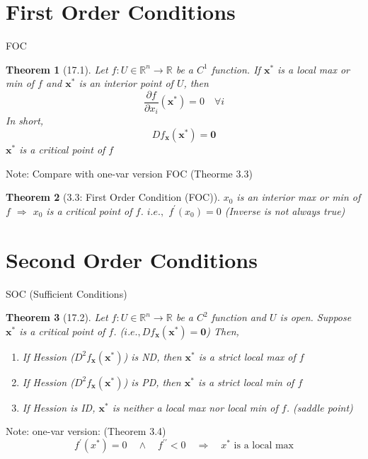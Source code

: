 \documentclass[a4paper,11pt]{article}
\newtheorem{thm}{Theorem}
\newcommand{\bb}{\mathbb}
\newcommand{\bd}{\mathbf}
\newcommand{\p}{\partial}
\begin{document}
\section{First Order Conditions} %
\label{sec:first_order_conditions}
\begin{frame}[t]{FOC}
	\begin{thm}
		[17.1] Let $f:U\in\bb{R}^n\rightarrow\bb{R}$ be a $C^1$ function. If $\bd{x^\ast}$ is a local max or min of $f$ and $\bd{x^\ast}$ is an interior point of $U$, then\[
			\frac{\p f}{\p x_i}(\bd{x^\ast})=0\quad\forall i
		\] In short, \[
			Df_{\bd{x}}(\bd{x^\ast}) = \bd{0}
		\] $\bd{x^\ast}$ is a critical point of $f$
	\end{thm}
	Note: Compare with one-var version FOC (Theorme 3.3)	\begin{thm}
		[3.3: First Order Condition (FOC)]
		$x_0$ is an interior max or min of $f$ $\Rightarrow$ $x_0$ is a critical point of $f$. $i.e.,$ $f^\prime(x_0)=0$
		(Inverse is not always true)
	\end{thm}
\end{frame}

\section{Second Order Conditions} %
\label{sec:second_order_conditions}
\begin{frame}[t]{SOC (Sufficient Conditions)}
	\begin{thm}
		[17.2] Let $f:U\in\bb{R}^n\rightarrow\bb{R}$ be a $C^2$ function and $U$ is open. Suppose $\bd{x^\ast}$ is a critical point of $f$. ($i.e.,Df_{\bd{x}}(\bd{x^\ast})=\bd{0}$) Then, 
		\begin{enumerate}
			\item If Hession ($D^2 f_\bd{x}(\bd{x^\ast})$) is ND, then $\bd{x}^\ast$ is a strict local max of $f$
			\item If Hession ($D^2 f_\bd{x}(\bd{x^\ast})$) is PD, then $\bd{x}^\ast$ is a strict local min of $f$
			\item If Hession is ID, $\bd{x^\ast}$ is neither a local max nor local min of $f$. (saddle point)
		\end{enumerate}
	\end{thm}
	Note: one-var version: (Theorem 3.4)\[
		f^\prime(x^\ast)=0\quad\land\quad f^{\prime\prime}<0 \quad\Rightarrow\quad x^\ast\text{ is a local max}
	\]
\end{frame}
\end{document}
